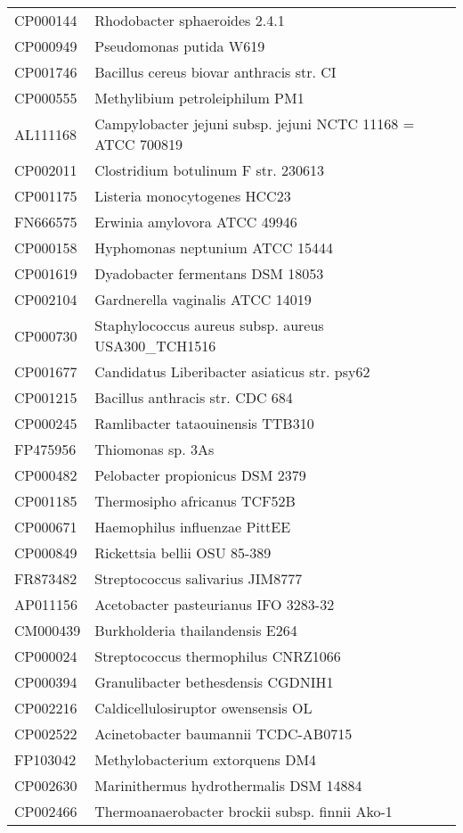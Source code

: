 \begin{longtable}{ll}
CP000144 & Rhodobacter sphaeroides 2.4.1\\
CP000949 & Pseudomonas putida W619\\
CP001746 & Bacillus cereus biovar anthracis str. CI\\
CP000555 & Methylibium petroleiphilum PM1\\
AL111168 & Campylobacter jejuni subsp. jejuni NCTC 11168 = ATCC 700819\\
CP002011 & Clostridium botulinum F str. 230613\\
CP001175 & Listeria monocytogenes HCC23\\
FN666575 & Erwinia amylovora ATCC 49946\\
CP000158 & Hyphomonas neptunium ATCC 15444\\
CP001619 & Dyadobacter fermentans DSM 18053\\
CP002104 & Gardnerella vaginalis ATCC 14019\\
CP000730 & Staphylococcus aureus subsp. aureus USA300_TCH1516\\
CP001677 & Candidatus Liberibacter asiaticus str. psy62\\
CP001215 & Bacillus anthracis str. CDC 684\\
CP000245 & Ramlibacter tataouinensis TTB310\\
FP475956 & Thiomonas sp. 3As\\
CP000482 & Pelobacter propionicus DSM 2379\\
CP001185 & Thermosipho africanus TCF52B\\
CP000671 & Haemophilus influenzae PittEE\\
CP000849 & Rickettsia bellii OSU 85-389\\
FR873482 & Streptococcus salivarius JIM8777\\
AP011156 & Acetobacter pasteurianus IFO 3283-32\\
CM000439 & Burkholderia thailandensis E264\\
CP000024 & Streptococcus thermophilus CNRZ1066\\
CP000394 & Granulibacter bethesdensis CGDNIH1\\
CP002216 & Caldicellulosiruptor owensensis OL\\
CP002522 & Acinetobacter baumannii TCDC-AB0715\\
FP103042 & Methylobacterium extorquens DM4\\
CP002630 & Marinithermus hydrothermalis DSM 14884\\
CP002466 & Thermoanaerobacter brockii subsp. finnii Ako-1\\

\end{longtable}
